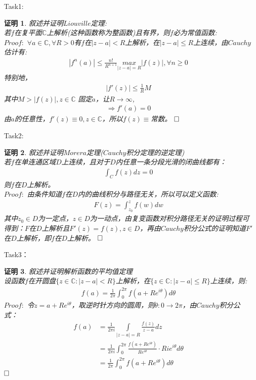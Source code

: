 \documentclass{ctexart}
\newcommand{\。}{．} %
\newenvironment{lanse}{
    \begin{tcolorbox}[breakable,enhanced, colback=qlan, boxrule=0pt, frame hidden,
        borderline west={0.7mm}{0.1mm}{slan}]
    }
    {\end{tcolorbox}}
\newenvironment{huangse}{
    \begin{tcolorbox}[breakable,enhanced, colback=qhuang, boxrule=0pt, frame hidden,
        borderline west={0.7mm}{0.1mm}{shuang}]
    }
    {\end{tcolorbox}}
\newenvironment{zise}{
    \begin{tcolorbox}[breakable,enhanced, colback=qzi, boxrule=0pt, frame hidden,
        borderline west={0.7mm}{0.1mm}{szi}]
    }
    {\end{tcolorbox}}
\theoremstyle{t} %
\newtheorem{dlhj}{\color{shuang} 定理}[subsection]
\newtheorem{lthj}{\color{szi} }
\newtheorem*{zmhj}{\color{slan} 证明}
\newenvironment{zm}{\begin{lanse}\begin{zmhj}}{$\hfill \square$\end{zmhj}\end{lanse}}
\newenvironment{dl}{\begin{huangse}\begin{dlhj}}{\end{dlhj}\end{huangse}}
\newenvironment{lt}{\begin{zise}\begin{lthj}}{\end{lthj}\end{zise}}
\begin{document}

Task1:
\begin{zm}
    叙述并证明$Liouville$定理:\\
    若$f$在复平面$\mathbb{C}$上解析(这种函数称为整函数)且有界，则$f$必为常值函数:\\
    $Proof:$ $\forall a\in \mathbb{C},\forall R>0$有$f$在$|z-a|<R$上解析，在$|z-a|\le R$上连续，由$Cauchy $估计有:
    \begin{align*}
        |f^{n}(a)|\le \frac{n!}{R^{n+1}}\underset{|z-a|=R}{max}|f(z)|,\forall n \ge 0
    \end{align*}
    特别地，
    \begin{align*}
        \left|f'(z)\right|\le \frac{1}{R}M
    \end{align*}
    其中$M>|f(z)|,z\in\mathbb{C}$
    固定$a$，让$R\to \infty$,
    \begin{align*}
        \Rightarrow f'(a)=0
    \end{align*}
    由$a$的任意性，$f'(z)\equiv 0,z\in\mathbb{C}$，所以$f(z)\equiv$常数。
\end{zm}
Task2:
\begin{zm}
    叙述并证明$Morera$定理($Cauchy$积分定理的逆定理)\\
    若$f$在单连通区域$D$上连续，且对于$D$内任意一条分段光滑的闭曲线都有：
    \begin{align*}
        \int_{C}f(z)dz=0
    \end{align*}
    则$f$在$D$上解析。\\
    $Proof:$ 由条件知道$f$在$D$内的曲线积分与路径无关，所以可以定义函数:
    \begin{align*}
        F(z)=\int_{z_0}^{z}f(w)dw
    \end{align*}
    其中$z_0\in D$为一定点，$z\in D$为一动点，由复变函数对积分路径无关的证明过程可得到：$F$在$D$上解析且$F'(z)=f(z),z\in D$，再由$Cauchy$积分公式的证明知道$F'$在$D$上解析，即$f$在$D$上解析。
\end{zm}
Task3：
\begin{zm}
    叙述并证明解析函数的平均值定理\\
    设函数$f$在开圆盘$\{z\in\mathbb{C}:|z-a|<R\}$上解析，在$\{z\in\mathbb{C}:|z-a|\le R\}$上连续，则:
    \begin{align*}
        f(a)=\frac{1}{2\pi}\int_{0}^{2\pi}f(a+Re^{i\theta})d\theta
    \end{align*}
    $Proof:$ 令$z=a+Re^{i\theta}$，取逆时针方向的圆周，则$\theta:0\to 2\pi$，由$Cauchy$积分公式：
    \begin{align*}
        f(a)&=\frac{1}{2\pi i}\int\limits_{|z-a|=R}\frac{f(z)}{z-a}dz\\
        &=\frac{1}{2\pi i}\int_{0}^{2\pi}\frac{f(a+Re^{i\theta})}{Re^{i\theta}}\cdot Rie^{i\theta}d\theta\\
        &=\frac{1}{2\pi}\int_{0}^{2\pi}f(a+Re^{i\theta})d\theta
    \end{align*}
\end{zm}
\end{document}

